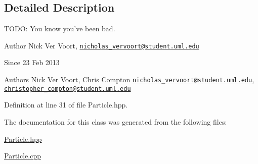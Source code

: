 \subsection{Detailed Description}
T\-O\-D\-O\-: You know you've been bad. 

\begin{DoxyAuthor}{Author}
Nick Ver Voort, \href{mailto:nicholas_vervoort@student.uml.edu}{\tt nicholas\-\_\-vervoort@student.\-uml.\-edu} 
\end{DoxyAuthor}
\begin{DoxySince}{Since}
23 Feb 2013 
\end{DoxySince}
\begin{DoxyAuthor}{Authors}
Nick Ver Voort, Chris Compton \href{mailto:nicholas_vervoort@student.uml.edu}{\tt nicholas\-\_\-vervoort@student.\-uml.\-edu}, \href{mailto:christopher_compton@student.uml.edu}{\tt christopher\-\_\-compton@student.\-uml.\-edu} 
\end{DoxyAuthor}


Definition at line 31 of file Particle.\-hpp.



The documentation for this class was generated from the following files\-:\begin{DoxyCompactItemize}
\item 
\hyperlink{_particle_8hpp}{Particle.\-hpp}\item 
\hyperlink{_particle_8cpp}{Particle.\-cpp}\end{DoxyCompactItemize}
